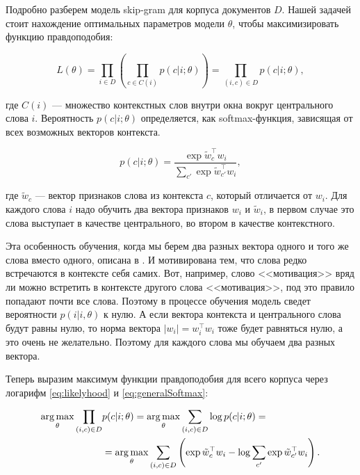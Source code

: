 \bigskip
Подробно разберем модель skip-gram для корпуса документов $D$. Нашей задачей стоит нахождение оптимальных параметров модели $\theta$, чтобы максимизировать функцию правдоподобия:

\begin{equation} \label{eq:likelyhood}
 L(\theta)=\prod_{i\in D}\left(\prod_{c\in C(i)} p(c|i;\theta)\right) = \prod_{(i,c)\in D}p(c|i;\theta),
\end{equation}

где $C(i)$ --- множество контекстных слов внутри окна вокруг центрального слова $i$. Вероятность $p(c|i;\theta )$ определяется, как softmax-функция, зависящая от всех возможных векторов контекста.

\begin{equation} \label{eq:generalSoftmax}
 p(c|i;\theta) = \frac{\exp{\tilde{w}_c^\top w_i}}{\sum_{c'} \exp{\tilde{w}_{c'}^\top w_i}},
\end{equation}

где $\tilde{w}_c$ --- вектор признаков слова из контекста $c$, который отличается от $w_i$. Для каждого слова $i$ надо обучить два вектора признаков $w_i$ и $\tilde{w}_i$, в первом случае это слова выступает в качестве центрального, во втором в качестве контекстного.

\bigskip
Эта особенность обучения, когда мы берем два разных вектора одного и того же слова вместо одного, описана в \cite{Goldberg}. И мотивирована тем, что слова редко встречаются в контексте себя самих. Вот, например, слово <<мотивация>> вряд ли можно встретить в контексте другого слова <<мотивация>>, под это правило попадают почти все слова. Поэтому в процессе обучения модель сведет вероятности $p(i|i, \theta)$ к нулю. А если вектора контекста и центрального слова будут равны нулю, то норма вектора $|w_i| = w_i^\top w_i$ тоже будет равняться нулю, а это очень не желательно. Поэтому для каждого слова мы обучаем два разных вектора.

\bigskip
Теперь выразим максимум функции правдоподобия для всего корпуса через логарифм \ref{eq:likelyhood} и \ref{eq:generalSoftmax}:

\begin{equation}
\begin{aligned}
 \operatorname*{arg\,max}_{\theta} \prod_{(i,c)\in D} & p(c|i;\theta) = \operatorname*{arg\,max}_{\theta} \sum_{(i,c)\in D}\log{p(c|i;\theta)} = \\
 & = \operatorname*{arg\,max}_{\theta} \sum_{(i,c)\in D} \left(\exp{\tilde{w}_c^\top w_i} - \log{\sum_{c'} \exp{\tilde{w}_{c'}^\top w_i}}\right).
\end{aligned}
\end{equation}

